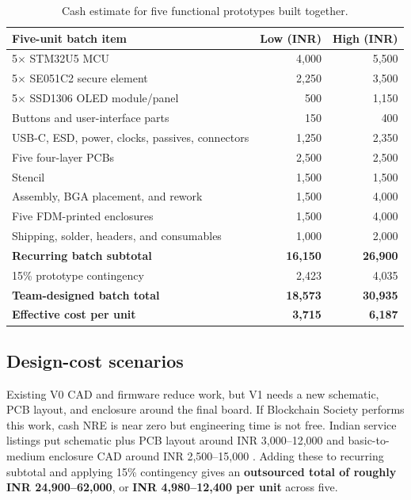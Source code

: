 \documentclass[10pt]{article}
\begin{document}
\begin{table}[H]
\centering\small
\renewcommand{\arraystretch}{1.12}
\begin{tabularx}{\textwidth}{@{}Xr r@{}}
\toprule
\textbf{Five-unit batch item} & \textbf{Low (INR)} & \textbf{High (INR)}\\
\midrule
5$\times$ STM32U5 MCU & 4,000 & 5,500\\
5$\times$ SE051C2 secure element & 2,250 & 3,500\\
5$\times$ SSD1306 OLED module/panel & 500 & 1,150\\
Buttons and user-interface parts & 150 & 400\\
USB-C, ESD, power, clocks, passives, connectors & 1,250 & 2,350\\
Five four-layer PCBs & 2,500 & 2,500\\
Stencil & 1,500 & 1,500\\
Assembly, BGA placement, and rework & 1,500 & 4,000\\
Five FDM-printed enclosures & 1,500 & 4,000\\
Shipping, solder, headers, and consumables & 1,000 & 2,000\\
\midrule
\textbf{Recurring batch subtotal} & \textbf{16,150} & \textbf{26,900}\\
15\% prototype contingency & 2,423 & 4,035\\
\textbf{Team-designed batch total} & \textbf{18,573} & \textbf{30,935}\\
\textbf{Effective cost per unit} & \textbf{3,715} & \textbf{6,187}\\
\bottomrule
\end{tabularx}
\caption{Cash estimate for five functional prototypes built together.}
\end{table}

\subsection{Design-cost scenarios}
Existing V0 CAD and firmware reduce work, but V1 needs a new schematic, PCB
layout, and enclosure around the final board. If Blockchain Society performs
this work, cash NRE is near zero but engineering time is not free. Indian
service listings put schematic plus PCB layout around INR 3,000--12,000 and
basic-to-medium enclosure CAD around INR 2,500--15,000
\cite{pcb-design-cost,pcb-design-upper,cad-cost}. Adding these to recurring subtotal and applying
15\% contingency gives an \textbf{outsourced total of roughly INR
24,900--62,000}, or \textbf{INR 4,980--12,400 per unit} across five.
\end{document}
